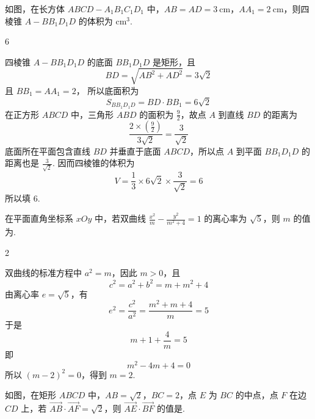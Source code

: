 \begin{problem}
如图，在长方体 \(ABCD-A_{1}B_{1}C_{1}D_{1}\) 中，\(AB = AD = 3 \mathrm{~cm}\)，\(AA_{1} = 2 \mathrm{~cm}\)，则四棱锥 \(A-BB_{1}D_{1}D\) 的体积为\fillinblank{} \(\mathrm{cm}^{3}\).

\end{problem}

\begin{answer}
6
\end{answer}

\begin{solution}
四棱锥 \(A-BB_{1}D_{1}D\) 的底面 \(BB_{1}D_{1}D\) 是矩形，且
\[
BD=\sqrt{AB^{2}+AD^{2}}=3\sqrt{2}
\]
且 \(BB_{1}=AA_{1}=2\)，
所以底面积为
\[
S_{BB_{1}D_{1}D}=BD\cdot BB_{1}=6\sqrt{2}
\]
在正方形 \(ABCD\) 中，三角形 \(ABD\) 的面积为 \(\frac{9}{2}\)，故点 \(A\) 到直线 \(BD\) 的距离为
\[
\frac{2\times(\frac{9}{2})}{3\sqrt{2}}=\frac{3}{\sqrt{2}}
\]
底面所在平面包含直线 \(BD\) 并垂直于底面 \(ABCD\)，所以点 \(A\) 到平面 \(BB_{1}D_{1}D\) 的距离也是 \(\frac{3}{\sqrt{2}}\). 因而四棱锥的体积为
\[
V=\frac{1}{3}\times6\sqrt{2}\times\frac{3}{\sqrt{2}}=6
\]
所以填 \(6\).
\end{solution}

\begin{problem}
在平面直角坐标系 \(xOy\) 中，若双曲线 \(\frac{x^2}{m} - \frac{y^2}{m^2 + 4} = 1\) 的离心率为 \(\sqrt{5}\)，则 \(m\) 的值为\fillinblank{}.
\end{problem}

\begin{answer}
2
\end{answer}

\begin{solution}
双曲线的标准方程中 \(a^{2}=m\)，因此 \(m>0\)，且
\[
c^{2}=a^{2}+b^{2}=m+m^{2}+4
\]
由离心率 \(e=\sqrt{5}\)，有
\[
e^{2}=\frac{c^{2}}{a^{2}}=\frac{m^{2}+m+4}{m}=5
\]
于是
\[
m+1+\frac{4}{m}=5
\]
即
\[
m^{2}-4m+4=0
\]
所以 \((m-2)^{2}=0\)，得到 \(m=2\).
\end{solution}

\begin{problem}
如图，在矩形 \(ABCD\) 中，\(AB = \sqrt{2}\)，\(BC = 2\)，点 \(E\) 为 \(BC\) 的中点，点 \(F\) 在边 \(CD\) 上，若 \(\overrightarrow{AB} \cdot \overrightarrow{AF} = \sqrt{2}\)，则 \(\overrightarrow{AE} \cdot \overrightarrow{BF}\) 的值是\fillinblank{}.

\end{problem}


